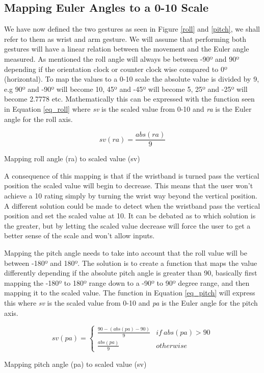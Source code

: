 \subsection{Mapping Euler Angles to a 0-10 Scale}
We have now defined the two gestures as seen in Figure \ref{roll} and \ref{pitch}, we shall refer to them as wrist and arm gesture. We will assume that performing both gestures will have a linear relation between the movement and the Euler angle measured. As mentioned the roll angle will always be between -90º and 90º depending if the orientation clock or counter clock wise compared to 0º (horizontal). To map the values to a 0-10 scale the absolute value is divided by 9, e.g 90º and -90º will become 10, 45º and -45º will become 5, 25º and -25º will become 2.7778 etc. Mathematically this can be expressed with the function seen in Equation \ref{eq_roll} where \emph{sv} is the scaled value from 0-10 and \emph{ra} is the Euler angle for the roll axis.

\begin{eqfloat}
\begin{equation}
sv\left ( ra \right ) = \frac{abs\left (ra\right )}{9}
\label{eq:linear}
\end{equation}
\caption{Mapping roll angle (ra) to scaled value (sv)}
\label{eq_roll}
\end{eqfloat}

A consequence of this mapping is that if the wristband is turned pass the vertical position the scaled value will begin to decrease. This means that the user won't achieve a 10 rating simply by turning the wrist way beyond the vertical position. A different solution could be made to detect when the wristband pass the vertical position and set the scaled value at 10. It can be debated as to which solution is the greater, but by letting the scaled value decrease will force the user to get a better sense of the scale and won't allow  inputs.

Mapping the pitch angle needs to take into account that the roll value will be between -180º and 180º. The solution is to create a function that maps the value differently depending if the absolute pitch angle is greater than 90, basically first mapping the -180º to 180º range down to a -90º to 90º degree range, and then mapping it to the scaled value. The function in Equation \ref{eq_pitch} will express this where \emph{sv} is the scaled value from 0-10 and \emph{pa} is the Euler angle for the pitch axis.

\begin{eqfloat}
\begin{equation}
sv\left ( pa \right ) = \left\{\begin{matrix}
\frac{90-\left ( abs\left ( pa \right )-90 \right )}{9} & if\ abs(pa) > 90 \\ 
\frac{abs\left ( pa \right )}{9} & otherwise
\end{matrix}\right.
\label{eq:linear}
\end{equation}
\caption{Mapping pitch angle (pa) to scaled value (sv)}
\label{eq_pitch}
\end{eqfloat}


